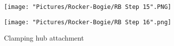 \documentclass[12pt]{article}
\begin{document}
\begin{enumerate}
\begin{figure}[H]
  \centering
  \begin{minipage}[b]{0.45\textwidth}
    \texttt{[image: "Pictures/Rocker-Bogie/RB Step 15".PNG]}
  \end{minipage}
  \hfill
  \begin{minipage}[b]{0.45\textwidth}
    \texttt{[image: "Pictures/Rocker-Bogie/RB Step 16".png]}
  \end{minipage}
  \caption{Clamping hub attachment}
\end{figure}


\end{enumerate}
\end{document}
